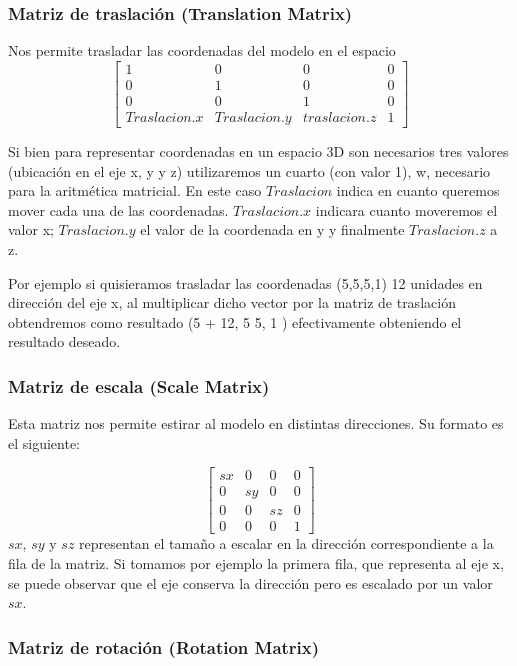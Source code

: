 \documentclass[a4paper]{article}
\begin{document}
\subsubsection{Matriz de traslación (Translation Matrix)} 

Nos permite trasladar las coordenadas del modelo en el espacio   
 \[
\begin{bmatrix}
1 & 0 & 0 & 0 \\
0 & 1 & 0 & 0 \\
0 & 0 & 1 & 0 \\
Traslacion.x & Traslacion.y & traslacion.z & 1  
\end{bmatrix}
\]


Si bien para representar  coordenadas en un espacio 3D son necesarios tres valores (ubicación en el eje x, y y z) utilizaremos un cuarto (con valor 1), w,  necesario para la aritmética matricial. En este caso $Traslacion$ indica en cuanto queremos mover cada una de las coordenadas. $Traslacion.x$ indicara cuanto moveremos el valor x;  $Traslacion.y$ el valor de la coordenada en y y finalmente $Traslacion.z$ a z.
\par Por ejemplo si quisieramos trasladar las coordenadas (5,5,5,1) 12 unidades en dirección del eje x, al multiplicar dicho vector por la matriz de traslación obtendremos como resultado (5 + 12, 5 5, 1 ) efectivamente obteniendo el resultado deseado.  

\subsubsection{Matriz de escala (Scale Matrix)}

Esta matriz nos permite estirar al modelo en distintas direcciones. Su formato es el siguiente:
 
\[
\begin{bmatrix}
sx & 0 & 0 & 0 \\
0 & sy & 0 & 0 \\
0 & 0 & sz & 0 \\
0 & 0 & 0 & 1  
\end{bmatrix}
\]
$sx$, $sy$ y $sz$ representan el tamaño a escalar en la dirección correspondiente a la fila de la matriz. Si tomamos por ejemplo la primera fila, que representa al eje x, se puede observar que el eje conserva la dirección pero es escalado por un valor $sx$. 

\subsubsection{Matriz de rotación (Rotation Matrix)}
\end{document}
